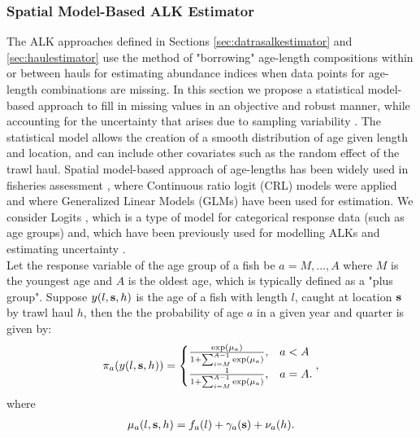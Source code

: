 \documentclass[a4paper 12pt]{article}
\numberwithin{equation}{section}
\begin{document}
\subsubsection{Spatial Model-Based ALK Estimator}
\label{sec:spatialModelALK}
The ALK approaches defined in Sections \ref{sec:datrasalkestimator} and \ref{sec:haulestimator} use the method of "borrowing" age-length compositions within or between hauls for estimating abundance indices when data points for age-length combinations are missing. In this section we propose a statistical model-based approach to fill in missing values in an objective and robust manner, while accounting for the uncertainty that arises due to sampling variability \citep{berg2012spatial}. The statistical model allows the creation of a smooth distribution of age given length and location, and can include other covariates such as the random effect of the trawl haul. Spatial model-based approach of age-lengths has been widely used in fisheries assessment \citep{berg2012spatial, kvist2000using, rindorf2001analyses}, where Continuous ratio logit (CRL) models were applied and where Generalized Linear Models (GLMs) have been used for estimation. We consider Logits \citep{dyke1952analysis,agresti2003categorical}, which is a type of model for categorical response data (such as age groups) and, which have been previously used for modelling ALKs and estimating uncertainty \citep{gerritsen2006simple}.  \\
\indent Let the response variable of the age group of a fish be $a = M,...,A$ where $M$ is the youngest age and $A$ is the oldest age, which is typically defined as a "plus group". Suppose $y(l,{\bf s},h)$ is the age  of a fish with length $l$, caught at location ${\bf s}$ by trawl haul $h$, then the the probability of age $a$ in a given year and quarter is given by:
\begin{align}
\pi_a(y(l,{\bf s},h)) =
\begin{cases}
\frac{\exp(\mu_a)}{1+ \sum_{i = M}^{A-1} \exp(\mu_a)} ,& a<A \\
\frac{1}{1+ \sum_{i = M}^{A-1} \exp(\mu_a)},& a=A.
\end{cases},
\label{model}
\end{align}
where 
\begin{align}\label{eq:linearPred}
\mu_a(l,{\bf s},h) = f_a(l)  + \gamma_a({\bf s}) + \nu_a(h).
\end{align}
\end{document}
